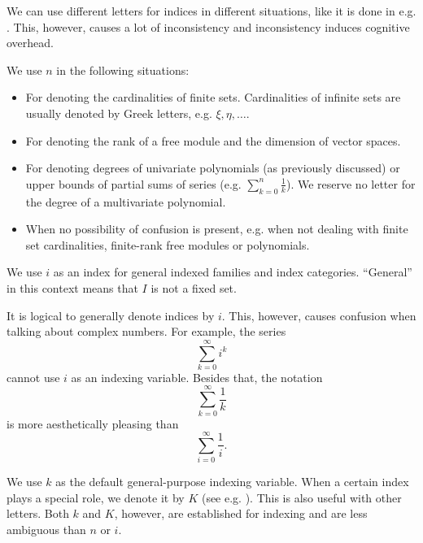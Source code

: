 \begin{enumerate}
  We can use different letters for indices in different situations, like it is done in e.g. \cite{Rudin1991}. This, however, causes a lot of inconsistency and inconsistency induces cognitive overhead.

  We use \( n \) in the following situations:
  \begin{itemize}
    \item For denoting the cardinalities of finite sets. Cardinalities of infinite sets are usually denoted by Greek letters, e.g. \( \xi, \eta, \ldots \).

    \item For denoting the rank of a free module and the dimension of vector spaces.

    \item For denoting degrees of univariate polynomials (as previously discussed) or upper bounds of partial sums of series (e.g. \( \sum_{k=0}^n \frac 1 k \)). We reserve no letter for the degree of a multivariate polynomial.

    \item When no possibility of confusion is present, e.g. when not dealing with finite set cardinalities, finite-rank free modules or polynomials.
  \end{itemize}

   We use \( i \) as an index for general indexed families and index categories. \enquote{General} in this context means that \( I \) is not a fixed set.

  It is logical to generally denote indices by \( i \). This, however, causes confusion when talking about complex numbers. For example, the series
  \begin{equation*}
    \sum_{k=0}^\infty i^k
  \end{equation*}
  cannot use \( i \) as an indexing variable. Besides that, the notation
  \begin{equation*}
    \sum_{k=0}^\infty \frac 1 k
  \end{equation*}
  is more aesthetically pleasing than
  \begin{equation*}
    \sum_{i=0}^\infty \frac 1 i.
  \end{equation*}

   We use \( k \) as the default general-purpose indexing variable. When a certain index plays a special role, we denote it by \( K \) (see e.g. ). This is also useful with other letters. Both \( k \) and \( K \), however, are established for indexing and are less ambiguous than \( n \) or \( i \).


\end{enumerate}
